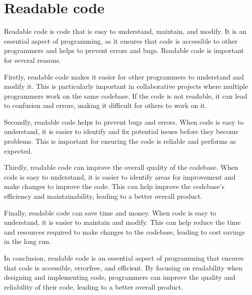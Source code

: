 \documentclass[letterpaper,12pt,english]{book}
\begin{document}
\section{Readable code}
\label{\detokenize{intro:readable-code}}
\sphinxAtStartPar
Readable code is code that is easy to understand, maintain, and modify. It is an essential aspect of programming, as it ensures that code is accessible to other programmers and helps to prevent errors and bugs. Readable code is important for several reasons.

\sphinxAtStartPar
Firstly, readable code makes it easier for other programmers to understand and modify it. This is particularly important in collaborative projects where multiple programmers work on the same codebase. If the code is not readable, it can lead to confusion and errors, making it difficult for others to work on it.

\sphinxAtStartPar
Secondly, readable code helps to prevent bugs and errors. When code is easy to understand, it is easier to identify and fix potential issues before they become problems. This is important for ensuring the code is reliable and performs as expected.

\sphinxAtStartPar
Thirdly, readable code can improve the overall quality of the codebase. When code is easy to understand, it is easier to identify areas for improvement and make changes to improve the code. This can help improve the codebase’s efficiency and maintainability, leading to a better overall product.

\sphinxAtStartPar
Finally, readable code can save time and money. When code is easy to understand, it is easier to maintain and modify. This can help reduce the time and resources required to make changes to the codebase, leading to cost savings in the long run.

\sphinxAtStartPar
In conclusion, readable code is an essential aspect of programming that ensures that code is accessible, error\sphinxhyphen{}free, and efficient. By focusing on readability when designing and implementing code, programmers can improve the quality and reliability of their code, leading to a better overall product.

\sphinxAtStartPar
{}
\end{document}

